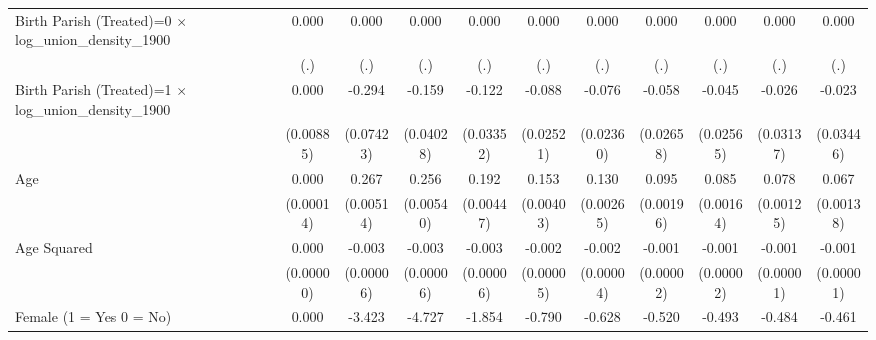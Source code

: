 {\begin{tabular}{l*{10}{c}}
Birth Parish (Treated)=0 $\times$ log\_union\_density\_1900&       0.000         &       0.000         &       0.000         &       0.000         &       0.000         &       0.000         &       0.000         &       0.000         &       0.000         &       0.000         \\
                    &         (.)         &         (.)         &         (.)         &         (.)         &         (.)         &         (.)         &         (.)         &         (.)         &         (.)         &         (.)         \\
Birth Parish (Treated)=1 $\times$ log\_union\_density\_1900&       0.000         &      -0.294\sym{***}&      -0.159\sym{***}&      -0.122\sym{***}&      -0.088\sym{***}&      -0.076\sym{**} &      -0.058\sym{*}  &      -0.045         &      -0.026         &      -0.023         \\
                    &   (0.00885)         &   (0.07423)         &   (0.04028)         &   (0.03352)         &   (0.02521)         &   (0.02360)         &   (0.02658)         &   (0.02565)         &   (0.03137)         &   (0.03446)         \\
Age                 &       0.000         &       0.267\sym{***}&       0.256\sym{***}&       0.192\sym{***}&       0.153\sym{***}&       0.130\sym{***}&       0.095\sym{***}&       0.085\sym{***}&       0.078\sym{***}&       0.067\sym{***}\\
                    &   (0.00014)         &   (0.00514)         &   (0.00540)         &   (0.00447)         &   (0.00403)         &   (0.00265)         &   (0.00196)         &   (0.00164)         &   (0.00125)         &   (0.00138)         \\
Age Squared         &       0.000         &      -0.003\sym{***}&      -0.003\sym{***}&      -0.003\sym{***}&      -0.002\sym{***}&      -0.002\sym{***}&      -0.001\sym{***}&      -0.001\sym{***}&      -0.001\sym{***}&      -0.001\sym{***}\\
                    &   (0.00000)         &   (0.00006)         &   (0.00006)         &   (0.00006)         &   (0.00005)         &   (0.00004)         &   (0.00002)         &   (0.00002)         &   (0.00001)         &   (0.00001)         \\
Female (1 = Yes 0 = No)&       0.000         &      -3.423\sym{***}&      -4.727\sym{***}&      -1.854\sym{***}&      -0.790\sym{***}&      -0.628\sym{***}&      -0.520\sym{***}&      -0.493\sym{***}&      -0.484\sym{***}&      -0.461\sym{***}\\

\end{tabular}}
